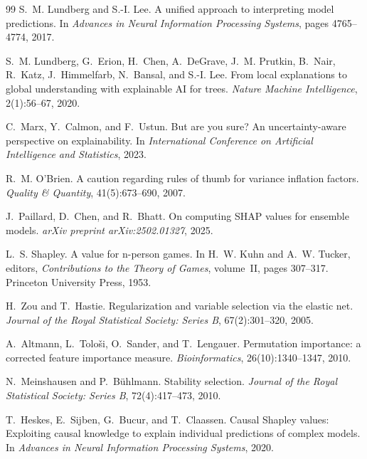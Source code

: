 \documentclass[11pt]{article}
\begin{document}
\begin{thebibliography}{99}
S.~M. Lundberg and S.-I. Lee.
\newblock A unified approach to interpreting model predictions.
\newblock In \emph{Advances in Neural Information Processing Systems}, pages
  4765--4774, 2017.

S.~M. Lundberg, G.~Erion, H.~Chen, A.~DeGrave, J.~M. Prutkin, B.~Nair,
  R.~Katz, J.~Himmelfarb, N.~Bansal, and S.-I. Lee.
\newblock From local explanations to global understanding with explainable {AI}
  for trees.
\newblock \emph{Nature Machine Intelligence}, 2(1):56--67, 2020.

C.~Marx, Y.~Calmon, and F.~Ustun.
\newblock But are you sure? An uncertainty-aware perspective on explainability.
\newblock In \emph{International Conference on Artificial Intelligence and
  Statistics}, 2023.

R.~M. O'Brien.
\newblock A caution regarding rules of thumb for variance inflation factors.
\newblock \emph{Quality \& Quantity}, 41(5):673--690, 2007.

J.~Paillard, D.~Chen, and R.~Bhatt.
\newblock On computing {SHAP} values for ensemble models.
\newblock \emph{arXiv preprint arXiv:2502.01327}, 2025.

L.~S. Shapley.
\newblock A value for n-person games.
\newblock In H.~W. Kuhn and A.~W. Tucker, editors, \emph{Contributions to the
  Theory of Games}, volume~II, pages 307--317. Princeton University Press, 1953.

H.~Zou and T.~Hastie.
\newblock Regularization and variable selection via the elastic net.
\newblock \emph{Journal of the Royal Statistical Society: Series B},
  67(2):301--320, 2005.

A.~Altmann, L.~Tolo{\v{s}}i, O.~Sander, and T.~Lengauer.
\newblock Permutation importance: a corrected feature importance measure.
\newblock \emph{Bioinformatics}, 26(10):1340--1347, 2010.

N.~Meinshausen and P.~B{\"u}hlmann.
\newblock Stability selection.
\newblock \emph{Journal of the Royal Statistical Society: Series B},
  72(4):417--473, 2010.

T.~Heskes, E.~Sijben, G.~Bucur, and T.~Claassen.
\newblock Causal {S}hapley values: Exploiting causal knowledge to explain
  individual predictions of complex models.
\newblock In \emph{Advances in Neural Information Processing Systems}, 2020.


\end{thebibliography}
\end{document}
